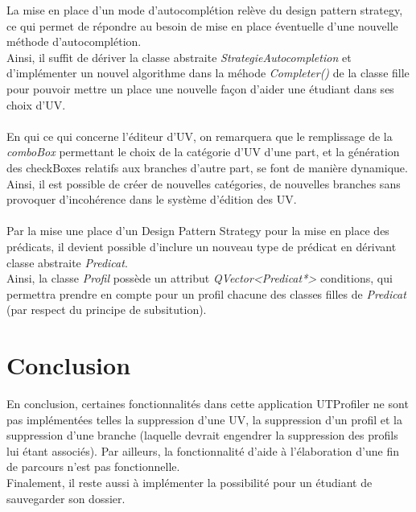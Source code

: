 \documentclass[a4paper,10pt,french]{report}
\begin{document}
	La mise en place d'un mode d'autocomplétion relève du design pattern strategy, ce qui permet de répondre au besoin de mise en place éventuelle d'une nouvelle méthode d'autocomplétion.\\
	Ainsi, il suffit de dériver la classe abstraite \emph{StrategieAutocompletion} et d'implémenter un nouvel algorithme dans la méhode \emph{Completer()} de la classe fille pour pouvoir mettre un place une nouvelle façon d'aider une étudiant dans ses choix d'UV.\\\\
	
	En qui ce qui concerne l'éditeur d'UV, on remarquera que le remplissage de la \emph{comboBox} permettant le choix de la catégorie d'UV d'une part, et la génération des checkBoxes relatifs aux branches d'autre part, se font de manière dynamique. Ainsi, il est possible de créer de nouvelles catégories, de nouvelles branches sans provoquer d'incohérence dans le système d'édition des UV.\\\\
	
    Par la mise une place d'un Design Pattern Strategy pour la mise en place des prédicats, il devient possible d'inclure un nouveau type de prédicat en dérivant classe abstraite \emph{Predicat}.\\
    Ainsi, la classe \emph{Profil} possède un attribut \emph{QVector<Predicat*>} conditions, qui permettra prendre en compte pour un profil chacune des classes filles de \emph{Predicat} (par respect du principe de subsitution).
    
	
	
	
	
	
\newpage			
\section*{Conclusion}\label{sec:Conclusion}

En conclusion, certaines fonctionnalités dans cette application UTProfiler ne sont pas implémentées telles la suppression d'une UV, la suppression d'un profil et la suppression d'une branche (laquelle devrait engendrer la suppression des profils lui étant associés).
Par ailleurs, la fonctionnalité d'aide à l'élaboration d'une fin de parcours n'est pas fonctionnelle.\\
Finalement, il reste aussi à implémenter la possibilité pour un étudiant de sauvegarder son dossier.
\end{document}
